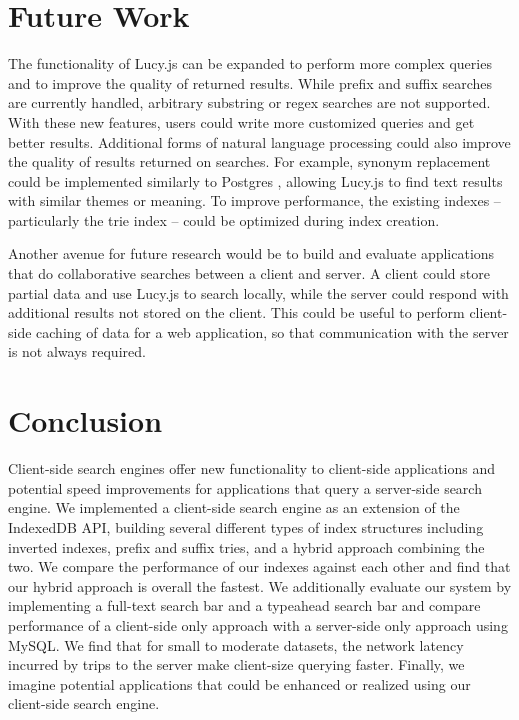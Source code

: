 \documentclass{vldb}
\begin{document}
\section{Future Work}
The functionality of Lucy.js can be expanded to perform more complex queries and to improve the quality of returned results. While prefix and suffix searches are currently handled, arbitrary substring or regex searches are not supported. With these new features, users could write more customized queries and get better results. Additional forms of natural language processing could also improve the quality of results returned on searches. For example, synonym replacement could be implemented similarly to Postgres , allowing Lucy.js to find text results with similar themes or meaning. To improve performance, the existing indexes -- particularly the trie index -- could be optimized during index creation.

Another avenue for future research would be to build and evaluate applications that do collaborative searches between a client and server. A client could store partial data and use Lucy.js to search locally, while the server could respond with additional results not stored on the client. This could be useful to perform client-side caching of data for a web application, so that communication with the server is not always required.

\section{Conclusion}

Client-side search engines offer new functionality to client-side applications and potential speed improvements for applications that query a server-side search engine. We implemented a client-side search engine as an extension of the IndexedDB API, building several different types of index structures including inverted indexes, prefix and suffix tries, and a hybrid approach combining the two. We compare the performance of our indexes against each other and find that our hybrid approach is overall the fastest. We additionally evaluate our system by implementing a full-text search bar and a typeahead search bar and compare performance of a client-side only approach with a server-side only approach using MySQL. We find that for small to moderate datasets, the network latency incurred by trips to the server make client-size querying faster. Finally, we imagine potential applications that could be enhanced or realized using our client-side search engine.



\end{document}
